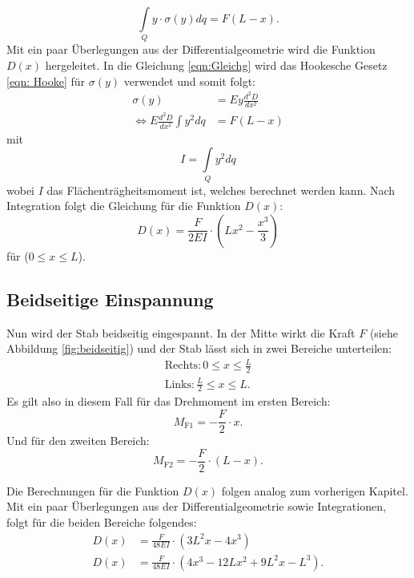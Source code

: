 \begin{equation}
\label{eqn:Gleichg}
\int\limits_Q y \cdot \sigma(y) dq = F(L-x).
\end{equation}
Mit ein paar Überlegungen aus der Differentialgeometrie wird die Funktion $D(x)$ hergeleitet. In die Gleichung \ref{eqn:Gleichg} wird das Hookesche Gesetz \ref{eqn: Hooke} für $\sigma(y)$ verwendet und somit folgt:
\begin{align*}
\sigma(y) &= Ey \frac{d^2 D}{dx^2} \\
\Longleftrightarrow E \frac{d^2 D}{dx^2} \int y^2 dq &= F(L-x) 
\end{align*}
mit
\begin{equation*}
\label{eqn: flächenträgheitsmoment}
I = \int\limits_Q y^2 dq
\end{equation*}
wobei $I$ das Flächenträgheitsmoment ist, welches berechnet werden kann. Nach Integration folgt die Gleichung für die Funktion $D(x)$:
\begin{equation}
D(x) = \frac{F}{2 E I} \cdot (Lx^2 - \frac{x^3}{3})
\label{eqn:elastizitaetsmodul-einseitig}
\end{equation}
für ($0 \leq x \leq L$).

\subsection{Beidseitige Einspannung}
Nun wird der Stab beidseitig eingespannt. In der Mitte wirkt die Kraft $F$ (siehe Abbildung \ref{fig:beidseitig})  und der Stab lässt sich in zwei Bereiche unterteilen:
\begin{equation*}
\begin{aligned}
	\text{Rechts}: 0 \leq x \leq \frac{L}{2} \\
	\text{Links}: \frac{L}{2} \leq x \leq L.
\end{aligned}
\end{equation*}
Es gilt also in diesem Fall für das Drehmoment im ersten Bereich:
\begin{equation*}
M_\text{F1} = -\frac{F}{2} \cdot x.
\end{equation*}
Und für den zweiten Bereich:
\begin{equation*}
M_\text{F2} = -\frac{F}{2} \cdot (L-x).
\end{equation*}

Die Berechnungen für die Funktion $D(x)$ folgen analog zum vorherigen Kapitel. Mit ein paar Überlegungen aus der Differentialgeometrie sowie Integrationen, folgt für die beiden Bereiche folgendes:
\begin{equation}
\begin{aligned}
D(x) &= \frac{F}{48EI} \cdot (3L^2x - 4x^3) \\
D(x) &= \frac{F}{48EI} \cdot (4x^3 - 12Lx^2 + 9L^2x - L^3).
\label{eqn:e_beidseitig}
\end{aligned}
\end{equation}

